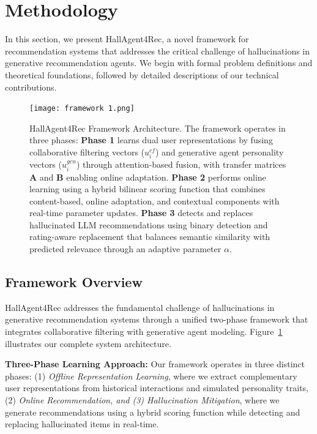 \documentclass[acmsmall]{acmart}
\begin{document}

\section{Methodology}

In this section, we present HallAgent4Rec, a novel framework for recommendation systems that addresses the critical challenge of hallucinations in generative recommendation agents. We begin with formal problem definitions and theoretical foundations, followed by detailed descriptions of our technical contributions.

\begin{figure}
    \centering
    \texttt{[image: framework 1.png]}
    \caption{HallAgent4Rec Framework Architecture. The framework operates in three phases: \textbf{Phase 1} learns dual user representations by fusing collaborative filtering vectors ($u^{cf}_i$) and generative agent personality vectors ($u^{gen}_i$) through attention-based fusion, with transfer matrices $\mathbf{A}$ and $\mathbf{B}$ enabling online adaptation. \textbf{Phase 2} performs online learning using a hybrid bilinear scoring function that combines content-based, online adaptation, and contextual components with real-time parameter updates. \textbf{Phase 3} detects and replaces hallucinated LLM recommendations using binary detection and rating-aware replacement that balances semantic similarity with predicted relevance through an adaptive parameter $\alpha$.}
    \label{fig:framework}
\end{figure}
\subsection{Framework Overview}
\label{sec:framework_overview}

HallAgent4Rec addresses the fundamental challenge of hallucinations in generative recommendation systems through a unified two-phase framework that integrates collaborative filtering with generative agent modeling. Figure~\ref{fig:framework} illustrates our complete system architecture.

\textbf{Three-Phase Learning Approach:} Our framework operates in three distinct phases: (1) \textit{Offline Representation Learning}, where we extract complementary user representations from historical interactions and simulated personality traits, (2) \textit{Online Recommendation, and (3) Hallucination Mitigation}, where we generate recommendations using a hybrid scoring function while detecting and replacing hallucinated items in real-time.
\end{document}
